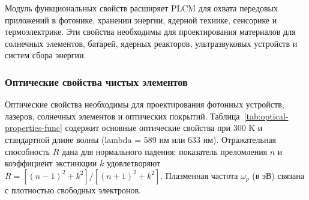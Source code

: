 \documentclass[12pt,a4paper]{article}
\begin{document}
	Модуль функциональных свойств расширяет PLCM для охвата передовых приложений в фотонике, хранении энергии, ядерной технике, сенсорике и термоэлектрике. Эти свойства необходимы для проектирования материалов для солнечных элементов, батарей, ядерных реакторов, ультразвуковых устройств и систем сбора энергии.
	
	\subsubsection{Оптические свойства чистых элементов}
	\label{subsec:optical-properties}
	
	Оптические свойства необходимы для проектирования фотонных устройств, лазеров, солнечных элементов и оптических покрытий. Таблица~\ref{tab:optical-properties-func} содержит основные оптические свойства при 300 K и стандартной длине волны (lambda = 589 нм или 633 нм). Отражательная способность \(R\) дана для нормального падения; показатель преломления \(n\) и коэффициент экстинкции \(k\) удовлетворяют \(R = [(n-1)^2 + k^2]/[(n+1)^2 + k^2]\). Плазменная частота \(\omega_p\) (в эВ) связана с плотностью свободных электронов.
	
\end{document}
